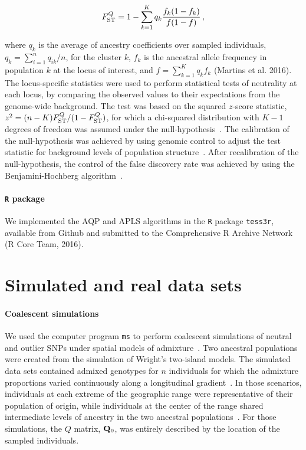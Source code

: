 $$
F^{Q}_{\rm ST} = 1 - \sum_{k=1}^K  q_k \frac{f_k (1-f_k)}{f(1-f)} \, ,
$$

\noindent where $q_k$ is the average of ancestry coefficients over sampled individuals, $q_k = \sum_{i =1}^n q_{ik}/n$, for the cluster $k$, $f_k$ is the ancestral allele frequency in population $k$ at the locus of interest, and $f = \sum_{k = 1}^K q_k f_k$ (Martins et al. 2016). The locus-specific statistics were used to perform statistical tests of neutrality at each locus, by comparing the observed values to their expectations from the genome-wide background. The test was based on the squared $z$-score statistic, $z^2 = (n-K) F^{Q}_{\rm ST}/(1 - F^{Q}_{\rm ST})$, for which a  chi-squared distribution with $K-1$ degrees of freedom was assumed under the null-hypothesis~\citep{Martins2016}. The calibration of the null-hypothesis was achieved by using genomic control to adjust the test statistic for background levels of population structure~\citep{Devlin1999, Francois2016}. After recalibration of the null-hypothesis, the control of the false discovery rate was achieved by using the Benjamini-Hochberg algorithm~\citep{Benjamini1995}.


\paragraph{{\tt R} package} We implemented the AQP and APLS algorithms in the {\tt R} package {\tt tess3r}, available from Github and submitted to the Comprehensive R Archive Network (R Core Team, 2016).  


\section{Simulated and real data sets}
\paragraph{Coalescent simulations} We used the computer program {\tt ms} to perform coalescent simulations of neutral and outlier SNPs under spatial models of admixture~\citep{Hudson2002}. Two ancestral populations were created from the simulation of Wright\rq{}s two-island models. The simulated data sets contained admixed genotypes for $n$ individuals for which the admixture proportions varied continuously along a longitudinal gradient~\citep{Durand2009, Francois2010}. In those scenarios, individuals at each extreme of the geographic range were representative of their population of origin, while individuals at the center of the range shared intermediate levels of ancestry in the two ancestral populations~\citep{Caye2016}. For those simulations, the $Q$ matrix, ${\bf Q}_0$, was entirely described by the location of the sampled individuals.


